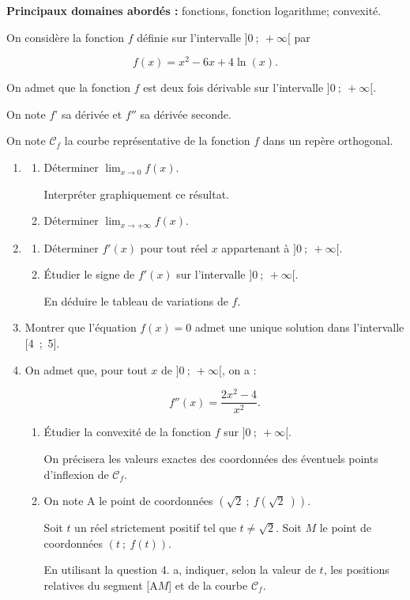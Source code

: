 \medskip

\textbf{Principaux domaines abordés :} fonctions, fonction logarithme; convexité.

\medskip

On considère la fonction $f$ définie sur l'intervalle $]0~;~+\infty[$ par

\[f(x) = x^2 - 6x + 4\ln (x).\]

On admet que la fonction $f$ est deux fois dérivable sur l'intervalle $]0~;~+ \infty[$.

On note $f$' sa dérivée et $f''$ sa dérivée seconde.

On note $\mathcal{C}_f$ la courbe représentative de la fonction $f$ dans un repère orthogonal.

\medskip

\begin{enumerate}
\item 
	\begin{enumerate}
		\item Déterminer $\displaystyle\lim_{x \to 0} f(x)$.
	
Interpréter graphiquement ce résultat.
		\item Déterminer $\displaystyle\lim_{x \to + \infty} f(x)$.
	\end{enumerate}	
\item
	\begin{enumerate}
		\item Déterminer $f'(x)$ pour tout réel $x$ appartenant à $]0~;~+ \infty[$.

		\item Étudier le signe de $f'(x)$ sur l'intervalle $]0~;~+ \infty[$.
		
En déduire le tableau de variations de $f$.
	\end{enumerate}
\item Montrer que l'équation $f(x) = 0$ admet une unique solution dans l'intervalle [4~;~5].
\item On admet que, pour tout $x$ de $]0~;~+ \infty[$, on a :

\[f''(x) = \dfrac{2x^2 - 4}{x^2}.\]

	\begin{enumerate}
		\item Étudier la convexité de la fonction $f$ sur $]0~;~+ \infty[$.
		
On précisera les valeurs exactes des coordonnées des éventuels points d'inflexion de $\mathcal{C}_f$.
		\item On note A le point de coordonnées $\left(\sqrt 2~;~f\left(\sqrt 2~\right)\right)$.
		
Soit $t$ un réel strictement positif tel que $t \ne \sqrt 2$. Soit $M$ le point de coordonnées $(t~;~ f(t))$.

En utilisant la question 4. a, indiquer, selon la valeur de $t$, les positions relatives du segment [A$M$] et de la courbe $\mathcal{C}_f$.
	\end{enumerate}
\end{enumerate}

\bigskip
